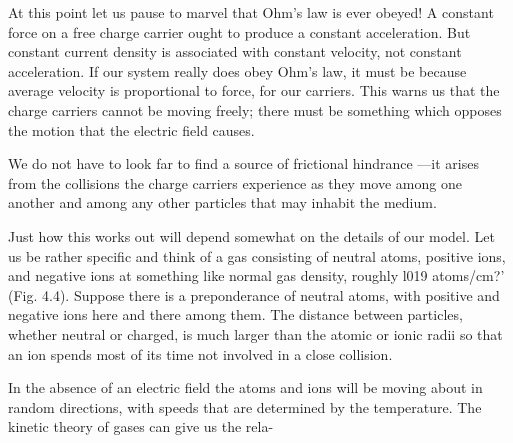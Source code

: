At this point let us pause to marvel that Ohm's law is ever obeyed!
A constant force on a free charge carrier ought to produce a constant
acceleration. But constant current density is associated with constant
velocity, not constant acceleration. If our system really does
obey Ohm's law, it must be because average velocity is proportional
to force, for our carriers. This warns us that the charge carriers cannot
be moving freely; there must be something which opposes the
motion that the electric field causes.

We do not have to look far to find a source of frictional hindrance
---it arises from the collisions the charge carriers experience as they
move among one another and among any other particles that may
inhabit the medium.

Just how this works out will depend somewhat on the details of
our model. Let us be rather specific and think of a gas consisting of
neutral atoms, positive ions, and negative ions at something like normal
gas density, roughly l019 atoms/cm?' (Fig. 4.4). Suppose there
is a preponderance of neutral atoms, with positive and negative ions
here and there among them. The distance between particles,
whether neutral or charged, is much larger than the atomic or ionic
radii so that an ion spends most of its time not involved in a close
collision.

In the absence of an electric field the atoms and ions will be moving
about in random directions, with speeds that are determined by
the temperature. The kinetic theory of gases can give us the rela-

